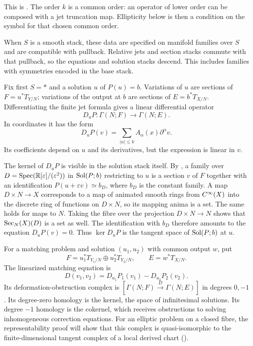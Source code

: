 This is \cite[Definitions~3.4.1--3.4.2]
{Steffens_Representability_Elliptic_Moduli}.
The order $k$ is a common order: an operator of lower order can be
composed with a jet truncation map. Ellipticity below is then a
condition on the symbol for that chosen common order.

When $S$ is a smooth stack, these data are specified on manifold
families over $S$ and are compatible with pullback. Relative jets and
section stacks commute with that pullback, so the equations and
solution stacks descend. This includes families with symmetries
encoded in the base stack.

Fix first $S=*$ and a solution $u$ of $P(u)=b$.
Variations of $u$ are sections of
$F=u^*T_{Y/N}$; variations of the output at $b$ are sections of
$E=b^*T_{X/N}$. Differentiating the finite jet formula gives a linear
differential operator
\[
 D_uP\colon\Gamma(N;F)\longrightarrow\Gamma(N;E).
\]
In coordinates it has the form
\[
 D_uP(v)=\sum_{|\alpha|\leq k}A_\alpha(x)\partial^\alpha v.
\]
Its coefficients depend on $u$ and its derivatives, but the expression
is linear in $v$.

The kernel of $D_uP$ is visible in the solution stack itself. By
, a family over
$D=\operatorname{Spec}(\mathbb{R}[\varepsilon]/(\varepsilon^2))$ in $\operatorname{Sol}(P;b)$ restricting to
$u$ is a section $v$ of $F$ together with an identification
$P(u+\varepsilon v)\simeq b_D$, where $b_D$ is the constant family.
A map $D\times N\to X$ corresponds to a map of animated smooth rings
from $C^\infty(X)$ into the discrete ring of functions on $D\times N$,
so its mapping anima is a set. The same holds for maps to $N$.
Taking the fibre over the projection $D\times N\to N$ shows that
$\operatorname{Sec}_N(X)(D)$ is a set as well. The identification with $b_D$
therefore amounts to the equation $D_uP(v)=0$.
Thus $\ker D_uP$ is the tangent space of $\operatorname{Sol}(P;b)$ at $u$.

For a matching problem and solution $(u_1,u_2)$ with common output $w$,
put
\[
 F=u_1^*T_{Y_1/N}\oplus u_2^*T_{Y_2/N},\qquad
 E=w^*T_{X/N}.
\]
The linearized matching equation is
\begin{equation}\label{eq:Tangent_Complex_Solution_Stack}
 D(v_1,v_2)=D_{u_1}P_1(v_1)-D_{u_2}P_2(v_2).
\end{equation}
Its deformation-obstruction complex is
$[\Gamma(N;F)\xrightarrow D\Gamma(N;E)]$ in degrees $0,-1$.
Its degree-zero homology is the kernel, the space of infinitesimal
solutions. Its degree $-1$ homology is the cokernel, which receives
obstructions to solving inhomogeneous correction equations.
For an elliptic problem on a closed fibre, the representability proof
will show that this complex is
quasi-isomorphic to the finite-dimensional tangent complex of a local
derived chart
().

